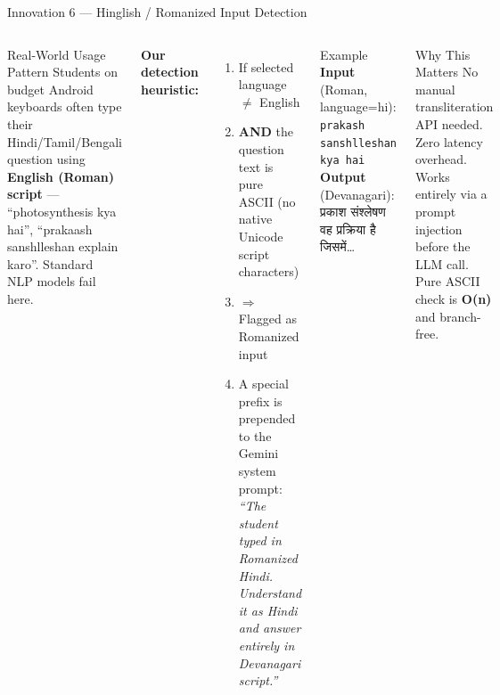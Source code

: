 \documentclass[aspectratio=169, 12pt]{beamer}
\begin{document}
\begin{frame}{Innovation 6 — Hinglish / Romanized Input Detection}
  \begin{columns}[T]
      \begin{block}{Real-World Usage Pattern}
        Students on budget Android keyboards often type their
        Hindi/Tamil/Bengali question using \textbf{English (Roman)
        script} — ``photosynthesis kya hai'', ``prakaash
        sanshlleshan explain karo''. Standard NLP models fail here.
      \end{block}
      \vspace{6pt}
      \textbf{Our detection heuristic:}
      \begin{enumerate}\small
        \item If selected language $\neq$ English
        \item \textbf{AND} the question text is pure ASCII
              (no native Unicode script characters)
        \item $\Rightarrow$ Flagged as Romanized input
        \item A special prefix is prepended to the Gemini
              system prompt:\\
              \emph{``The student typed in Romanized Hindi.
              Understand it as Hindi and answer entirely in
              Devanagari script.''}
      \end{enumerate}
      \begin{block}{Example}
        \textbf{Input} (Roman, language=hi):\\
        \small\texttt{prakash sanshlleshan kya hai}\\[6pt]
        \textbf{Output} (Devanagari):
        \small प्रकाश संश्लेषण वह प्रक्रिया है जिसमें\ldots
      \end{block}
      \vspace{6pt}
      \begin{block}{Why This Matters}
        No manual transliteration API needed. Zero latency overhead.
        Works entirely via a prompt injection before the LLM call.
        Pure ASCII check is \textbf{O(n)} and branch-free.
      \end{block}
  \end{columns}
\end{frame}

\end{document}
